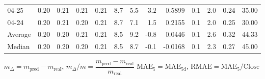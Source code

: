 \begin{threeparttable}
{\begin{tabular}{lrrrrrrrrrrrr}
  04-25 &          0.20 &          0.21 &          0.21 &        0.21 &                 8.7 &                 5.5 &        3.2 &       0.5899 &                 0.1 &              2.0 &            0.24 &                  35.00 \\
  04-24 &          0.20 &          0.21 &          0.20 &        0.21 &                 8.7 &                 7.1 &        1.5 &       0.2155 &                 0.1 &              2.0 &            0.25 &                  30.00 \\
Average &          0.20 &          0.20 &          0.21 &        0.21 &                 8.5 &                 9.2 &       -0.8 &       0.0446 &                 0.1 &              2.6 &            0.32 &                  44.33 \\
 Median &          0.20 &          0.20 &          0.20 &        0.21 &                 8.5 &                 8.7 &       -0.1 &      -0.0168 &                 0.1 &              2.3 &            0.27 &                  45.00 \\
\bottomrule
\end{tabular}
}
\begin{tablenotes}\footnotesize
\item $m_\Delta=m_{\text{pred}}-m_{\text{real}}$,
$m_\Delta/m=\dfrac{m_{\text{pred}}-m_{\text{real}}}{m_{\text{real}}}$
$\mathrm{MAE}_5=\mathrm{MAE}_{5\text{d}}$,
$\mathrm{RMAE}=\mathrm{MAE}_5/\text{Close}$
\end{tablenotes}
\end{threeparttable}
\endgroup

